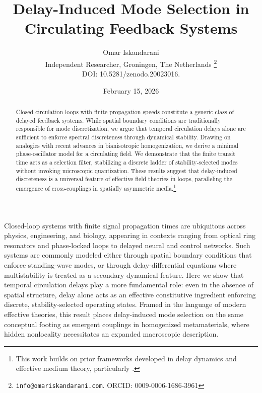 \documentclass[11pt,a4paper]{article}
\newcommand{\paperdoi}{10.5281/zenodo.20023016}
\begin{document}
    \title{Delay-Induced Mode Selection in Circulating Feedback Systems}
    \author{%
        Omar Iskandarani\\
        \small Independent Researcher, Groningen, The Netherlands%
        \thanks{\texttt{info@omariskandarani.com}. ORCID: 0009-0006-1686-3961}\\
        \small DOI: \paperdoi.%
    }
    \date{February 15, 2026}

    \maketitle
    \begin{abstract}
        Closed circulation loops with finite propagation speeds constitute a generic class of delayed feedback systems. While spatial boundary conditions are traditionally responsible for mode discretization, we argue that temporal circulation delays alone are sufficient to enforce spectral discreteness through dynamical stability. Drawing on analogies with recent advances in bianisotropic homogenization, we derive a minimal phase-oscillator model for a circulating field. We demonstrate that the finite transit time acts as a selection filter, stabilizing a discrete ladder of stability-selected modes without invoking microscopic quantization. These results suggest that delay-induced discreteness is a universal feature of effective field theories in loops, paralleling the emergence of cross-couplings in spatially asymmetric media.\footnote{This work builds on prior frameworks developed in delay dynamics and effective medium theory, particularly \cite{Willis2012, Yanchuk2017}.}
    \end{abstract}

    \par
    \noindent
    \normalfont\normalsize\justifying
    Closed-loop systems with finite signal propagation times are ubiquitous across physics, engineering, and biology, appearing in contexts ranging from optical ring resonators and phase-locked loops to delayed neural and control networks. Such systems are commonly modeled either through spatial boundary conditions that enforce standing-wave modes, or through delay-differential equations where multistability is treated as a secondary dynamical feature.
    Here we show that temporal circulation delays play a more fundamental role: even in the absence of spatial structure, delay alone acts as an effective constitutive ingredient enforcing discrete, stability-selected operating states.
     Framed in the language of modern effective theories, this result places delay-induced mode selection on the same conceptual footing as emergent couplings in homogenized metamaterials, where hidden nonlocality necessitates an expanded macroscopic description.
\end{document}
